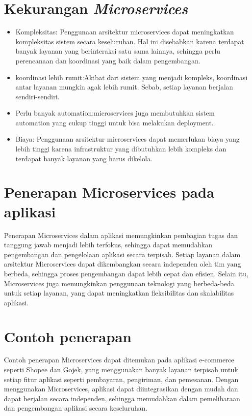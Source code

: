 \documentclass{report}
\begin{document}
	\section{Kekurangan \textit{Microservices}}
		\begin{itemize}
		\item Kompleksitas: Penggunaan arsitektur microservices dapat meningkatkan kompleksitas sistem secara keseluruhan. Hal ini disebabkan karena terdapat banyak layanan yang berinteraksi satu sama lainnya, sehingga perlu perencanaan dan koordinasi yang baik dalam pengembangan.
		\item koordinasi lebih rumit:Akibat dari sistem yang menjadi kompleks, koordinasi antar layanan mungkin agak lebih rumit. Sebab, setiap layanan berjalan sendiri-sendiri.
		\item Perlu banyak automation:microservices juga membutuhkan sistem automation yang cukup tinggi untuk bisa melakukan deployment.
		\item Biaya: Penggunaan arsitektur microservices dapat memerlukan biaya yang lebih tinggi karena infrastruktur yang dibutuhkan lebih kompleks dan terdapat banyak layanan yang harus dikelola.
		\end{itemize}
	
	\section{Penerapan Microservices pada aplikasi}
	
	Penerapan Microservices dalam aplikasi memungkinkan pembagian tugas dan tanggung jawab menjadi lebih terfokus, sehingga dapat memudahkan pengembangan dan pengelolaan aplikasi secara terpisah. Setiap layanan dalam arsitektur Microservices dapat dikembangkan secara independen oleh tim yang berbeda, sehingga proses pengembangan dapat lebih cepat dan efisien. Selain itu, Microservices juga memungkinkan penggunaan teknologi yang berbeda-beda untuk setiap layanan, yang dapat meningkatkan fleksibilitas dan skalabilitas aplikasi.
	
	
	\section{Contoh penerapan}
	Contoh penerapan Microservices dapat ditemukan pada aplikasi e-commerce seperti Shopee dan Gojek, yang menggunakan banyak layanan terpisah untuk setiap fitur aplikasi seperti pembayaran, pengiriman, dan pemesanan. Dengan menggunakan Microservices, aplikasi dapat diintegrasikan dengan mudah dan dapat berjalan secara independen, sehingga memudahkan dalam pemeliharaan dan pengembangan aplikasi secara keseluruhan.
	
\end{document}
